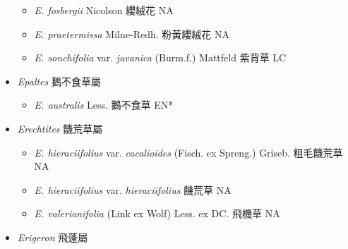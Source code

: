\begin{itemize}
  \begin{itemize}
        \item[] \textit{E. fosbergii} Nicolson  纓絨花   NA
        \item[] \textit{E. praetermissa} Milne-Redh.  粉黃纓絨花   NA
        \item[] \textit{E. sonchifolia} var. \textit{javanica} (Burm.f.) Mattfeld  紫背草   LC
  \end{itemize}
 \item[] \textit{Epaltes} 鵝不食草屬
                                
  \begin{itemize}
        \item[] \textit{E. australis} Less.  鵝不食草   EN*
  \end{itemize}
 \item[] \textit{Erechtites} 饑荒草屬
                                
  \begin{itemize}
        \item[] \textit{E. hieraciifolius} var. \textit{cacalioides} (Fisch. ex Spreng.) Griseb.  粗毛饑荒草   NA
        \item[] \textit{E. hieraciifolius} var. \textit{hieraciifolius}   饑荒草   NA
        \item[] \textit{E. valerianifolia} (Link ex Wolf) Less. ex DC.  飛機草   NA
  \end{itemize}
 \item[] \textit{Erigeron} 飛蓬屬
                                

\end{itemize}
